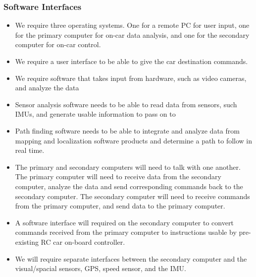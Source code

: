 \documentclass[compsoc,draftclsnofoot,onecolumn,10pt]{IEEEtran}
\begin{document}
\subsubsection{Software Interfaces} %
\begin{itemize}
	
	\item We require three operating systems. One for a remote PC for user input, one
	for the primary computer for on-car data analysis, and one for the secondary
	computer for on-car control.
	
	\item We require a user interface to be able to give the car destination commands. 
	
	\item We require software that takes input from hardware, such as video cameras,
	and analyze the data 
	
	\item Sensor analysis software needs to be able to read data from sensors, such IMUs, and generate usable information to pass on to 
	
	\item Path finding software needs to be able to integrate and analyze data from mapping and localization software products and determine a path to follow in real time.
	
	\item The primary and secondary computers will need to talk with one another. The
	primary computer will need to receive data from the secondary computer,
	analyze the data and send corresponding commands back to the secondary
	computer. The secondary computer will need to receive commands from the
	primary computer, and send data to the primary computer.
	
	\item A software interface will required on the secondary computer to convert
	commands received from the primary computer to instructions usable by
	pre-existing RC car on-board controller.
	
	\item We will require separate interfaces between the secondary computer and the
	visual/spacial sensors, GPS, speed sensor, and the IMU. 
	
\end{itemize}
\end{document}
